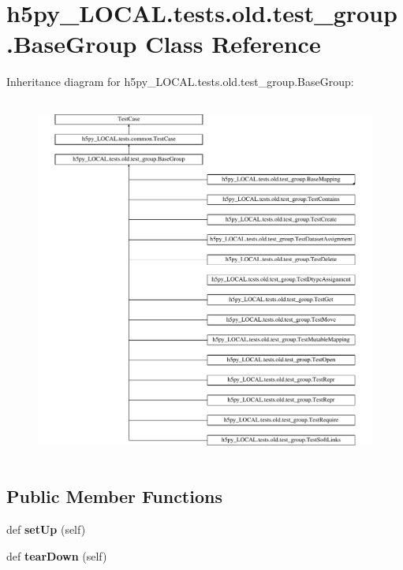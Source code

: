 \hypertarget{classh5py__LOCAL_1_1tests_1_1old_1_1test__group_1_1BaseGroup}{}\section{h5py\+\_\+\+L\+O\+C\+A\+L.\+tests.\+old.\+test\+\_\+group.\+Base\+Group Class Reference}
\label{classh5py__LOCAL_1_1tests_1_1old_1_1test__group_1_1BaseGroup}
Inheritance diagram for h5py\+\_\+\+L\+O\+C\+A\+L.\+tests.\+old.\+test\+\_\+group.\+Base\+Group\+:\begin{figure}[H]
\begin{center}
\leavevmode
\includegraphics[height=12.000000cm]{classh5py__LOCAL_1_1tests_1_1old_1_1test__group_1_1BaseGroup}
\end{center}
\end{figure}
\subsection*{Public Member Functions}
\begin{DoxyCompactItemize}
\item 
\mbox{\label{classh5py__LOCAL_1_1tests_1_1old_1_1test__group_1_1BaseGroup_a5c0387f8000961d27b19ad24bf832f74}} 
def {\bfseries set\+Up} (self)
\item 
\mbox{\label{classh5py__LOCAL_1_1tests_1_1old_1_1test__group_1_1BaseGroup_abcee9fa3222edcfb3e34a51c899853f5}} 
def {\bfseries tear\+Down} (self)
\end{DoxyCompactItemize}
